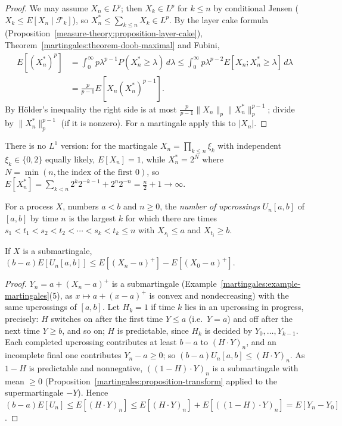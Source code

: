 \begin{proof}
We may assume $X_n \in L^p$; then $X_k \in L^p$ for $k \leq n$ by conditional Jensen ($X_k \leq E[X_n \mid \mathcal{F}_k]$), so $X_n^* \leq \sum_{k \leq n}X_k \in L^p$. By the layer cake formula
(Proposition~\ref{measure-theory:proposition-layer-cake}), Theorem~\ref{martingales:theorem-doob-maximal} and Fubini,
\[
\begin{aligned}
E[(X_n^*)^p] &= \int_0^\infty p\lambda^{p-1}P(X_n^* \geq \lambda)\,d\lambda \leq \int_0^\infty p\lambda^{p-2}E[X_n; X_n^* \geq \lambda]\,d\lambda \\
&= \frac{p}{p - 1}E[X_n(X_n^*)^{p-1}].
\end{aligned}
\]
By H\"older's inequality the right side is at most $\frac{p}{p - 1}\|X_n\|_p\|X_n^*\|_p^{p-1}$; divide by $\|X_n^*\|_p^{p-1}$ (if it is nonzero). For a martingale apply this to $|X_n|$.
\end{proof}

\begin{counterexample}\label{martingales:counterexample-doob-l1}
There is no $L^1$ version: for the martingale $X_n = \prod_{k \leq n}\xi_k$ with independent $\xi_k \in \{0, 2\}$ equally likely, $E[X_n] = 1$, while $X_n^* = 2^{N}$ where $N = \min(n, \text{the index of the first } 0)$, so
$E[X_n^*] = \sum_{k<n}2^k2^{-k-1} + 2^n2^{-n} = \frac n2 + 1 \to \infty$.
\end{counterexample}

\begin{definition}\label{martingales:definition-upcrossings}
For a process $X$, numbers $a < b$ and $n \geq 0$, the \emph{number of upcrossings} $U_n[a, b]$ of $[a, b]$ by time $n$ is the largest $k$ for which there are times $s_1 < t_1 < s_2 < t_2 < \cdots < s_k < t_k \leq n$ with
$X_{s_i} \leq a$ and $X_{t_i} \geq b$.
\end{definition}

\begin{lemma}\label{martingales:lemma-upcrossing}
If $X$ is a submartingale, $(b - a)E[U_n[a, b]] \leq E[(X_n - a)^+] - E[(X_0 - a)^+]$.
\end{lemma}

\begin{proof}
$Y_n = a + (X_n - a)^+$ is a submartingale (Example~\ref{martingales:example-martingales}(5), as $x \mapsto a + (x - a)^+$ is convex and nondecreasing) with the same upcrossings of $[a, b]$. Let $H_k = 1$ if time $k$ lies in an
upcrossing in progress, precisely: $H$ switches on after the first time $Y \leq a$ (i.e.\ $Y = a$) and off after the next time $Y \geq b$, and so on; $H$ is predictable, since $H_k$ is decided by $Y_0, \ldots, Y_{k-1}$. Each completed
upcrossing contributes at least $b - a$ to $(H \cdot Y)_n$, and an incomplete final one contributes $Y_n - a \geq 0$; so $(b - a)U_n[a, b] \leq (H \cdot Y)_n$. As $1 - H$ is predictable and nonnegative, $((1 - H) \cdot Y)_n$ is a
submartingale with mean $\geq 0$ (Proposition~\ref{martingales:proposition-transform} applied to the supermartingale $-Y$). Hence $(b - a)E[U_n] \leq E[(H \cdot Y)_n] \leq E[(H \cdot Y)_n] + E[((1 - H) \cdot Y)_n] = E[Y_n - Y_0]$.
\end{proof}

